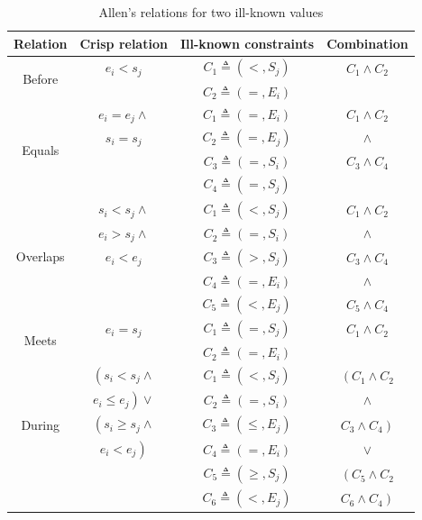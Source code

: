 \documentclass{llncs}
\begin{document}
\begin{table}
\centering
\caption{Allen's relations for two ill-known values}

\begin{tabular}{c c c c}
\hline
Relation & Crisp relation & Ill-known constraints & Combination \\ \hline
\multirow{2}{*}{Before}
&  $e_i < s_j$ & $C_1 \triangleq \left(<, S_j \right)$ & $C_1 \wedge C_2$\\
& & $C_2 \triangleq \left(= , E_i \right)$ &\\ \hline
\multirow{4}{*}{Equals}
&  $e_i = e_j \wedge $ & $C_1 \triangleq \left(=, E_i \right)$ & $C_1 \wedge C_2$\\
& $s_i = s_j $& $C_2 \triangleq \left(= , E_j \right)$ & $\wedge$\\
& & $C_3 \triangleq \left(= , S_i \right)$ & $C_3 \wedge C_4$\\
& & $C_4 \triangleq \left(= , S_j \right)$ &\\ \hline
\multirow{5}{*}{Overlaps}
&  $s_i < s_j \wedge $ & $C_1 \triangleq \left(< , S_j \right)$ & $C_1 \wedge C_2$\\
& $e_i > s_j \wedge $  & $C_2 \triangleq \left(= , S_i \right)$ & $\wedge$\\
& $e_i < e_j $         & $C_3 \triangleq \left(> , S_j \right)$ & $C_3 \wedge C_4$\\
&                      & $C_4 \triangleq \left(= , E_i \right)$ & $\wedge $ \\
&                      & $C_5 \triangleq \left(< , E_j \right)$ & $ C_5 \wedge C_4 $\\ \hline
\multirow{2}{*}{Meets}
& $e_i = s_j$ & $C_1 \triangleq \left(= , S_j \right)$ & $C_1 \wedge C_2$\\
&	      & $C_2 \triangleq \left(= , E_i \right)$ & \\ \hline
\multirow{5}{*}{During}
&  $ \left( s_i < s_j \wedge \right. $ & $C_1 \triangleq \left(< , S_j \right)$     & $ \left( C_1 \wedge C_2 \right.$\\
& $\left. e_i \leq e_j\right) \vee $   & $C_2 \triangleq \left(= , S_i \right)$     & $\wedge$\\
& $\left(s_i \geq s_j  \wedge \right.$ & $C_3 \triangleq \left(\leq , E_j \right)$  & $ \left.C_3 \wedge C_4 \right)$\\
& $\left. e_i < e_j \right)$           & $C_4 \triangleq \left(= , E_i \right)$     & $\vee $ \\
&                                      & $C_5 \triangleq \left(\geq , S_j \right)$  & $\left( C_5 \wedge C_2 \right.$\\ 
&                                      & $C_6 \triangleq \left(< , E_j \right)$     & $\left. C_6 \wedge C_4 \right)$\\ \hline



\hline 
\end{tabular}
\label{tbl:allen-relation-by-ill-known-constraints}



\end{table}
\end{document}
